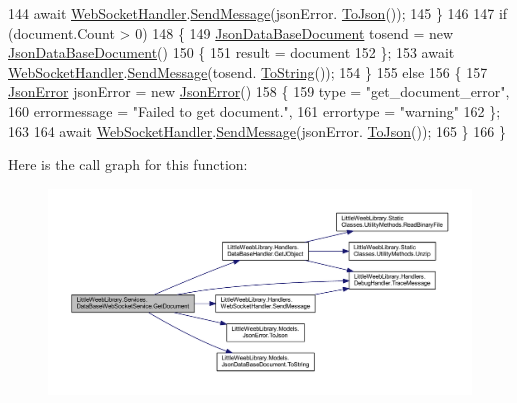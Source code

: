 \begin{DoxyCode}
144                 await \mbox{\hyperlink{class_little_weeb_library_1_1_handlers_1_1_web_socket_handler}{WebSocketHandler}}.\mbox{\hyperlink{class_little_weeb_library_1_1_handlers_1_1_web_socket_handler_a1de289d54d665a32c93478c68d3e6ad0}{SendMessage}}(jsonError.
      \mbox{\hyperlink{class_little_weeb_library_1_1_models_1_1_json_error_a0e3e7dd2e2990404b7f0461742b23440}{ToJson}}());
145             \}
146 
147             \textcolor{keywordflow}{if} (document.Count > 0)
148             \{
149                 \mbox{\hyperlink{class_little_weeb_library_1_1_models_1_1_json_data_base_document}{JsonDataBaseDocument}} tosend = \textcolor{keyword}{new} 
      \mbox{\hyperlink{class_little_weeb_library_1_1_models_1_1_json_data_base_document}{JsonDataBaseDocument}}()
150                 \{
151                     result = document
152                 \};
153                 await \mbox{\hyperlink{class_little_weeb_library_1_1_handlers_1_1_web_socket_handler}{WebSocketHandler}}.\mbox{\hyperlink{class_little_weeb_library_1_1_handlers_1_1_web_socket_handler_a1de289d54d665a32c93478c68d3e6ad0}{SendMessage}}(tosend.
      \mbox{\hyperlink{class_little_weeb_library_1_1_models_1_1_json_data_base_document_a0a84a997c39ac76d99382cdabf9227bf}{ToString}}());
154             \}
155             \textcolor{keywordflow}{else}
156             \{
157                 \mbox{\hyperlink{class_little_weeb_library_1_1_models_1_1_json_error}{JsonError}} jsonError = \textcolor{keyword}{new} \mbox{\hyperlink{class_little_weeb_library_1_1_models_1_1_json_error}{JsonError}}()
158                 \{
159                     type = \textcolor{stringliteral}{"get\_document\_error"},
160                     errormessage = \textcolor{stringliteral}{"Failed to get document."},
161                     errortype = \textcolor{stringliteral}{"warning"}
162                 \};
163 
164                 await \mbox{\hyperlink{class_little_weeb_library_1_1_handlers_1_1_web_socket_handler}{WebSocketHandler}}.\mbox{\hyperlink{class_little_weeb_library_1_1_handlers_1_1_web_socket_handler_a1de289d54d665a32c93478c68d3e6ad0}{SendMessage}}(jsonError.
      \mbox{\hyperlink{class_little_weeb_library_1_1_models_1_1_json_error_a0e3e7dd2e2990404b7f0461742b23440}{ToJson}}());
165             \}
166         \}
\end{DoxyCode}
Here is the call graph for this function\+:\nopagebreak
\begin{figure}[H]
\begin{center}
\leavevmode
\includegraphics[width=350pt]{class_little_weeb_library_1_1_services_1_1_data_base_web_socket_service_aa51350396b2aa1634a680c94bebdc64c_cgraph}
\end{center}
\end{figure}
